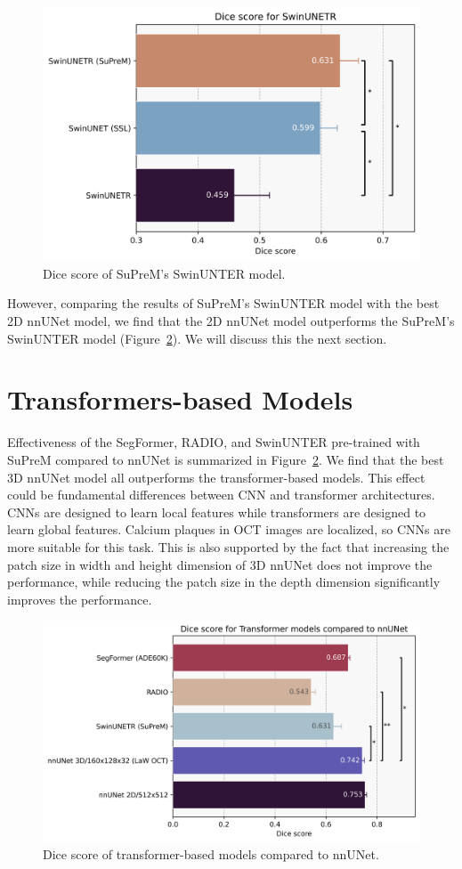 \documentclass[a4paper,11pt,oneside]{report}
\begin{document}
\begin{figure}[h]
    \centering
    \includegraphics[width=0.55\linewidth]{figures/result_SwinUNETR_results.png}
    \caption{Dice score of SuPreM's SwinUNTER model.}
    \label{fig:suprem-results}

\end{figure}

However, comparing the results of SuPreM's SwinUNTER model with the best 2D nnUNet model, we find that the 2D nnUNet model outperforms the SuPreM's SwinUNTER model (Figure~\ref{fig:transformer-results}). We will discuss this the next section.

\section{Transformers-based Models}
Effectiveness of the SegFormer, RADIO, and SwinUNTER pre-trained with SuPreM compared to nnUNet is summarized in Figure~\ref{fig:transformer-results}. We find that the best 3D nnUNet model all outperforms the transformer-based models. This effect could be fundamental differences between CNN and transformer architectures. CNNs are designed to learn local features while transformers are designed to learn global features. Calcium plaques in OCT images are localized, so CNNs are more suitable for this task. This is also supported by the fact that increasing the patch size in width and height dimension of 3D nnUNet does not improve the performance, while reducing the patch size in the depth dimension significantly improves the performance.

\begin{figure}[h]
    \centering
    \includegraphics[width=0.65\linewidth]{figures/result_nnUNet_vs_Transformer_results.png}
    \caption{Dice score of transformer-based models compared to nnUNet.}
    \label{fig:transformer-results}
\end{figure}
\end{document}
